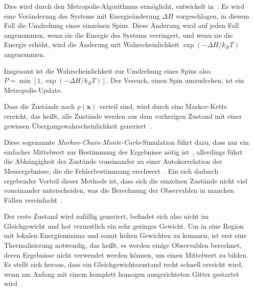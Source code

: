 	Dies wird durch den Metropolis-Algorithmus ermöglicht, entwickelt in~\cite{metropolisupdate}:
	Es wird eine Veränderung des Systems mit Energieänderung $\Delta H$ vorgeschlagen, in diesem Fall die Umdrehung eines einzelnen Spins. Diese Änderung wird auf jeden Fall angenommen, wenn sie die Energie des Systems verringert, und wenn sie die Energie erhöht, wird die Änderung mit Wahrscheinlichkeit $\exp(-\Delta H/k_BT)$ angenommen.
	
	Insgesamt ist die Wahrscheinlichkeit zur Umdrehung eines Spins also $P=\min \left[1, \exp(-\Delta H/k_BT)\right]$. Der Versuch, einen Spin umzudrehen, ist ein Metropolis-Update.
	
	Dass die Zustände nach $p(\mathbf{x})$ verteil sind, wird durch eine Markov-Kette erreicht, das heißt, alle Zustände werden aus dem vorherigen Zustand mit einer gewissen Übergangswahrscheinlichkeit generiert~\cite[vgl. ][S. 19 f.]{binderheermann}. 
	
	Diese sogenannte \textit{Markov-Chain-Monte-Carlo}-Simulation führt dazu, dass nur ein einfacher Mittelwert zur Bestimmung der Ergebnisse nötig ist~\cite[vgl. ][S. 19 f.]{binderheermann}, allerdings führt die Abhängigkeit der Zustände voneinander zu einer Autokorrelation der Messergebnisse, die die Fehlerbestimmung erschwert~\cite[vgl. ][S. 72 ff.]{skriptcompphys}. Ein sich dadurch ergebender Vorteil dieser Methode ist, dass sich die einzelnen Zustände nicht viel voneinander unterscheiden, was die Berechnung der Observablen in manchen Fällen vereinfacht~\cite[vgl. ][S. 102 f.]{binderheermann}.
	
	Der erste Zustand wird zufällig generiert, befindet sich also nicht im Gleichgewicht und hat vermutlich ein sehr geringes Gewicht. Um in eine Region mit lokalen Energieminima und somit hohen Gewichten zu kommen, ist erst eine Thermalisierung notwendig, das heißt, es werden einige Observablen berechnet, deren Ergebnisse nicht verwendet werden können, um einen Mittelwert zu bilden. %
	Es stellt sich heraus, dass ein Gleichgewichtszustand recht schnell erreicht wird, wenn am Anfang mit einem komplett homogen ausgerichteten Gitter gestartet wird~\cite[vgl. ][S. 100 f.]{binderheermann}.
	
